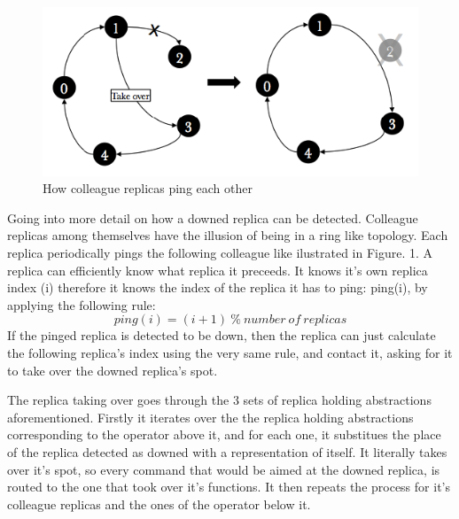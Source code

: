 \documentclass[times, 10pt,twocolumn]{article}
\begin{document}

\begin{figure}[h] \includegraphics[width=\columnwidth]{fault_detection}
	\caption{How colleague replicas ping each other} \end{figure}

Going into more detail on how a downed replica can be detected.  Colleague
replicas among themselves have the illusion of being in a ring like
topology. Each replica periodically pings the following colleague like
ilustrated in Figure. 1. A replica can efficiently know what replica it
preceeds. It knows it's own replica index (i) therefore it knows the index
of the replica it has to ping: ping(i), by applying the following rule:
\[ping(i) = (i + 1)\ \%\ number\ of\ replicas\] If the pinged replica is
detected to be down, then the replica can just calculate the following
replica's index using the very same rule, and contact it, asking for it to
take over the downed replica's spot. 


The replica taking over goes through the 3 sets of replica holding
abstractions aforementioned.  Firstly it iterates over the the replica
holding abstractions corresponding to the operator above it, and for each
one, it substitues the place of the replica detected as downed with a
representation of itself. It literally takes over it's spot, so every
command that would be aimed at the downed replica, is routed to the one
that took over it's functions.  It then repeats the process for it's
colleague replicas and the ones of the operator below it. 
\end{document}
